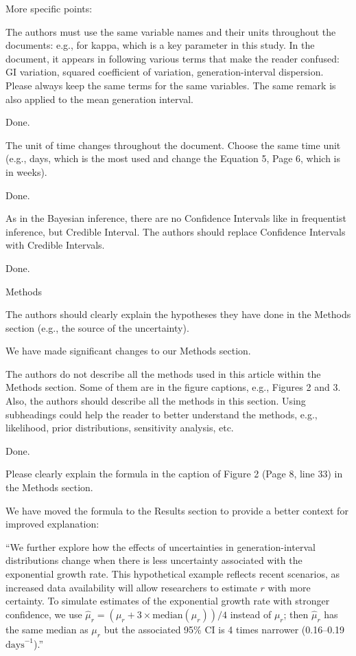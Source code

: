 \documentclass[12pt]{article}
\newcommand{\revtext}{\textsf}
\begin{document}
\revtext{More specific points:}

\revtext{The authors must use the same variable names and their units throughout the documents: e.g.,
for kappa, which is a key parameter in this study. In the document, it appears in following
various terms that make the reader confused: GI variation, squared coefficient of variation,
generation-interval dispersion. Please always keep the same terms for the same variables. The
same remark is also applied to the mean generation interval.}

Done.

\revtext{The unit of time changes throughout the document. Choose the same time unit (e.g., days,
which is the most used and change the Equation 5, Page 6, which is in weeks).}

Done.

\revtext{As in the Bayesian inference, there are no Confidence Intervals like in frequentist inference, but
Credible Interval. The authors should replace Confidence Intervals with Credible Intervals.}

Done.

\revtext{Methods}

\revtext{The authors should clearly explain the hypotheses they have done in the Methods section (e.g.,
the source of the uncertainty).}

We have made significant changes to our Methods section.

\revtext{The authors do not describe all the methods used in this article within the Methods section.
Some of them are in the figure captions, e.g., Figures 2 and 3. Also, the authors should describe
all the methods in this section. Using subheadings could help the reader to better understand
the methods, e.g., likelihood, prior distributions, sensitivity analysis, etc.}

Done.

\revtext{Please clearly explain the formula in the caption of Figure 2 (Page 8, line 33) in the Methods
section.}

We have moved the formula to the Results section to provide a better context for improved explanation: 

``We further explore how the effects of uncertainties in generation-interval distributions change when there is less uncertainty associated with the exponential growth rate.
This hypothetical example reflects recent scenarios, as increased data availability will allow researchers to estimate $r$ with more certainty.
To simulate estimates of the exponential growth rate with stronger confidence, we use $\hat{\mu}_r = (\mu_r + 3\times\mathrm{median}(\mu_r))/4$ instead of $\mu_r$; 
then $\hat{\mu}_r$ has the same median as $\mu_r$ but the associated 95\% CI is 4 times narrower (0.16--0.19 $\textrm{days}^{-1}$).''
\end{document}
